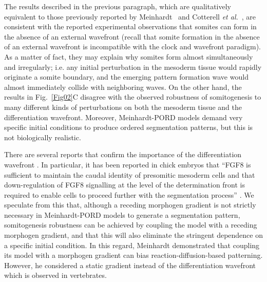 \documentclass[%
 preprint,
 aip, 
 amsmath,amssymb,
]{revtex4-2}
\begin{document}
The results described in the previous paragraph, which are qualitatively equivalent to those previously reported by Meinhardt~\cite{Meinhardt1982} and Cotterell \emph{et al.}~\citep{Cotterell2015}, are consistent with the reported experimental observations that somites can form in the absence of an external wavefront (recall that somite formation in the absence of an external wavefront is incompatible with the clock and wavefront paradigm). As a matter of fact, they may explain why somites form almost simultaneously and irregularly; i.e. any initial perturbation in the mesoderm tissue would rapidly originate a somite boundary, and the emerging pattern formation wave would almost immediately collide with neighboring waves. On the other hand, the results in Fig.~\ref{Fig02}C disagree with the observed robustness of somitogenesis to many different kinds of perturbations on both the mesoderm tissue and the differentiation wavefront. Moreover, Meinhardt-PORD models demand very specific initial conditions to produce ordered segmentation patterns, but this is not biologically realistic. 

There are several reports that confirm the importance of the differentiation wavefront \cite{Naiche2011, Sawada2001}. In particular, it has been reported in chick embryos that ``FGF8 is sufficient to maintain the caudal identity of presomitic mesoderm cells and that down-regulation of FGF8 signalling at the level of the determination front is required to enable cells to proceed further with the segmentation process'' \cite{Dubrulle2001}. We speculate from this that, although a receding morphogen gradient is not strictly necessary in Meinhardt-PORD models to generate a segmentation pattern, somitogenesis robustness can be achieved by coupling the model with a receding morphogen gradient, and that this will also eliminate the stringent dependence on a specific initial condition. In this regard, Meinhardt \cite{Meinhardt1982} demonstrated that coupling its model with a morphogen gradient can bias reaction-diffusion-based patterning. However, he considered a static gradient instead of the differentiation wavefront which is observed in vertebrates.
	
\end{document}
